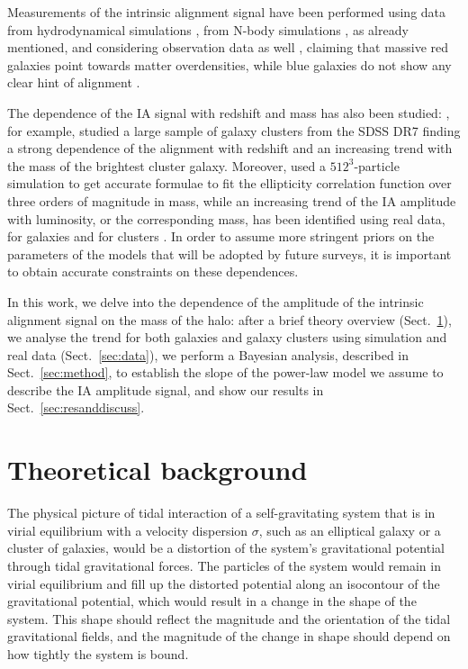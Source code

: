 \documentclass[a4paper,fleqn,usenatbib]{mnras}
\begin{document}
Measurements of the intrinsic alignment signal have been performed using data from hydrodynamical simulations \citep{Codisetal2015, Velliscigetal2015, Chisarietal2015, Hilbertetal2017, Tennetietal2016}, from N-body simulations \citep{Heavensetal2000, CroftMetzler2000, Jing2002, Kuhlenetal2007, Schneideretal2012}, as already mentioned, and considering observation data as well \citep{Mandelbaumetal2006, Hirataetal2007, Okumuraetal2009, Haoetal2011, vanUitertJoachimi2017}, claiming that massive red galaxies point towards matter overdensities, while blue galaxies do not show any clear hint of alignment \citep{Hirataetal2007, Mandelbaumetal2011}. 

The dependence of the IA signal with redshift and mass has also been studied: \citet{Haoetal2011}, for example, studied a large sample of galaxy clusters from the SDSS DR7 finding a strong dependence of the alignment with redshift and an increasing trend with the mass of the brightest cluster galaxy. Moreover, \citet{Jing2002} used a $512^3$-particle simulation to get accurate formulae to fit the ellipticity correlation function over three orders of magnitude in mass, while an increasing trend of the IA amplitude with luminosity, or the corresponding mass, has been identified using real data, for galaxies \citep{Joachimietal2011, Singhetal2015} and for clusters \citep{vanUitertJoachimi2017}. In order to assume more stringent priors on the parameters of the models that will be adopted by future surveys, it is important to obtain accurate constraints on these dependences.

In this work, we delve into the dependence of the amplitude of the intrinsic alignment signal on the mass of the halo: after a brief theory overview (Sect.~\ref{sec:theory}), we analyse the trend for both galaxies and galaxy clusters using simulation and real data (Sect.~\ref{sec:data}), we perform a Bayesian analysis, described in Sect.~\ref{sec:method}, to establish the slope of the power-law model we assume to describe the IA amplitude signal, and show our results in Sect.~\ref{sec:resanddiscuss}.
\section{Theoretical background}
\label{sec:theory}
The physical picture of tidal interaction of a self-gravitating system that is in virial equilibrium with a velocity dispersion $\sigma$, such as an elliptical galaxy or a cluster of galaxies, would be a distortion of the system's gravitational potential through tidal gravitational forces. The particles of the system would remain in virial equilibrium and fill up the distorted potential along an isocontour of the gravitational potential, which would result in a change in the shape of the system. This shape should reflect the magnitude and the orientation of the tidal gravitational fields, and the magnitude of the change in shape should depend on how tightly the system is bound.
\end{document}
